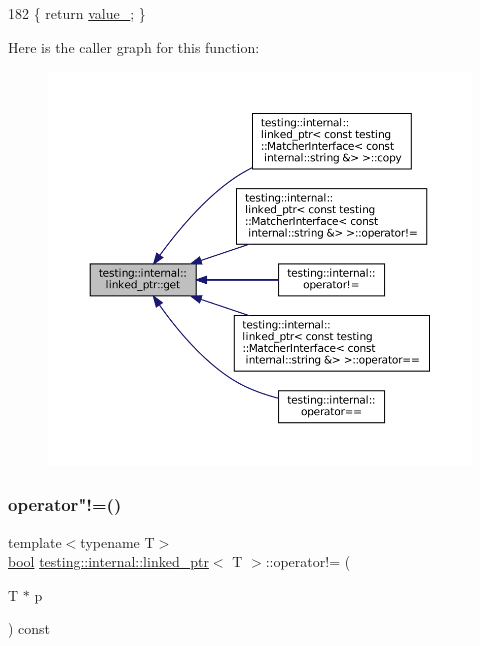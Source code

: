 \begin{DoxyCode}
182 \{ \textcolor{keywordflow}{return} \hyperlink{classtesting_1_1internal_1_1linked__ptr_abb52c4e944fc7a24a4ec7788b612fb37}{value\_}; \}
\end{DoxyCode}
Here is the caller graph for this function\+:
\nopagebreak
\begin{figure}[H]
\begin{center}
\leavevmode
\includegraphics[width=350pt]{classtesting_1_1internal_1_1linked__ptr_a0c2ba99eb3521806f83f5c4435465ce0_icgraph}
\end{center}
\end{figure}
\mbox{\label{classtesting_1_1internal_1_1linked__ptr_a10305395af92bd2fec7bca085cabc99c}} 
\subsubsection{\texorpdfstring{operator"!=()}{operator!=()}\hspace{0.1cm}{\footnotesize\ttfamily [1/2]}}
{\footnotesize\ttfamily template$<$typename T$>$ \\
\hyperlink{classbool}{bool} \hyperlink{classtesting_1_1internal_1_1linked__ptr}{testing\+::internal\+::linked\+\_\+ptr}$<$ T $>$\+::operator!= (\begin{DoxyParamCaption}\item[{T $\ast$}]{p }\end{DoxyParamCaption}) const\hspace{0.3cm}{\ttfamily [inline]}}



